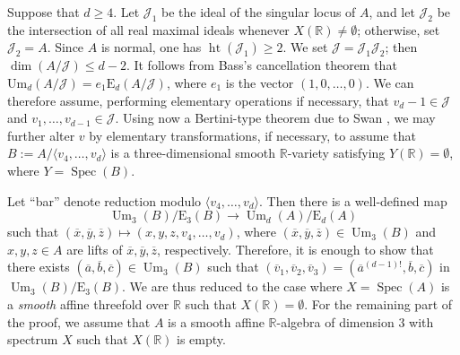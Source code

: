 \documentclass[11pt,leqno]{amsart}
\newcommand{\Spec}{\operatorname{Spec}}
\renewcommand{\1}{{\rm 1\hspace*{-0.4ex}%
\rule{0.1ex}{1.52ex}\hspace*{0.2ex}}}
\newcommand{\<}[1]{{\langle}#1 {\rangle}}
\newcommand{\Rb}{\mathbb{R}}
\newcommand{\Um}{\operatorname{Um}}
\theoremstyle{plain}
\theoremstyle{definition}
\theoremstyle{remark}
\numberwithin{equation}{section}
\begin{document}
Suppose that $d \geq 4$. Let $\mathcal{J}_1$ be the ideal of the singular locus of $A$, and let $\mathcal{J}_2$ be the intersection of all real maximal ideals whenever $X(\mathbb{R}) \neq \emptyset$; otherwise, set $\mathcal{J}_2 = A$. Since $A$ is normal, one has $\operatorname{ht}(\mathcal{J}_1) \geq 2$. We set $\mathcal{J} = \mathcal{J}_1 \mathcal{J}_2$; then $\dim(A/\mathcal{J}) \leq d-2$. It follows from Bass's cancellation theorem \cite{bassAlgebraicKtheory1968} that $\mathrm{Um}_d(A/\mathcal{J}) = e_1 \mathrm{E}_d(A/\mathcal{J})$, where $e_1$ is the vector $(1,0,\dots,0)$. We can therefore assume, performing elementary operations if necessary, that $v_d - 1 \in \mathcal{J}$ and $v_1, \ldots, v_{d-1} \in \mathcal{J}$. Using now a Bertini-type theorem due to Swan \cite[Theorem 1.5]{swanCancellationTheoremProjective1974}, we may further alter $v$ by elementary transformations, if necessary, to assume that $B := A/\langle v_4, \ldots, v_d\rangle $ is a three-dimensional smooth $\mathbb{R}$-variety satisfying $Y(\mathbb{R}) = \emptyset$, where $Y = \Spec(B)$.

Let “bar” denote reduction modulo $\langle v_4, \ldots, v_d \rangle$. Then there is a well-defined map
$$\Um_3(B)/\mathrm{E}_3(B) \to \Um_d(A)/\mathrm{E}_d(A)$$
such that $(\overline{x}, \overline{y}, \overline{z}) \mapsto (x, y, z, v_4, \ldots, v_d)$, where $(\overline{x}, \overline{y}, \overline{z}) \in \Um_3(B)$ and $x, y, z \in A$ are lifts of $\overline{x}, \overline{y}, \overline{z}$, respectively. Therefore, it is enough to show that there exists $(\overline{a}, \overline{b}, \overline{c}) \in \Um_3(B)$ such that $(\overline{v}_1, \overline{v}_2, \overline{v}_3) = (\overline{a}^{(d-1)!}, \overline{b}, \overline{c})$ in $\Um_3(B)/\mathrm{E}_3(B)$. We are thus
reduced to the case where $X=\Spec(A)$ is a \emph{smooth} affine threefold over $\mathbb{R}$ such that $X(\mathbb R)=\emptyset$. For the remaining part of the proof, we assume that $A$ is a smooth affine $\Rb$-algebra of dimension $3$ with spectrum $X$ such that $X(\Rb)$ is empty.
\end{document}

